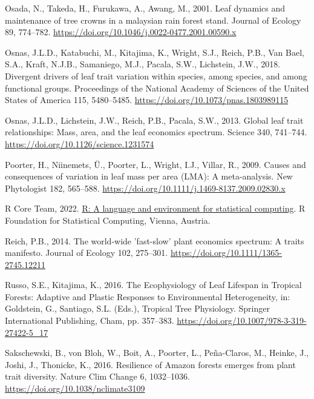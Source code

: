 \documentclass[
  12pt,
  letterpaper,
  DIV=11,
  numbers=noendperiod]{scrartcl}
\newlength{\cslhangindent}
\newenvironment{CSLReferences}[2] %
 {\begin{list}{}{%
  \setlength{\itemindent}{0pt}
  \setlength{\leftmargin}{0pt}
  \setlength{\parsep}{0pt}
  \ifodd #1
   \setlength{\leftmargin}{\cslhangindent}
   \setlength{\itemindent}{-1\cslhangindent}
  \fi
  \setlength{\itemsep}{#2\baselineskip}}}
 {\end{list}}
\begin{document}
\begin{CSLReferences}{1}{0}
Osada, N., Takeda, H., Furukawa, A., Awang, M., 2001. Leaf dynamics and
maintenance of tree crowns in a malaysian rain forest stand. Journal of
Ecology 89, 774--782.
\url{https://doi.org/10.1046/j.0022-0477.2001.00590.x}

Osnas, J.L.D., Katabuchi, M., Kitajima, K., Wright, S.J., Reich, P.B.,
Van Bael, S.A., Kraft, N.J.B., Samaniego, M.J., Pacala, S.W., Lichstein,
J.W., 2018. Divergent drivers of leaf trait variation within species,
among species, and among functional groups. Proceedings of the National
Academy of Sciences of the United States of America 115, 5480--5485.
\url{https://doi.org/10.1073/pnas.1803989115}

Osnas, J.L.D., Lichstein, J.W., Reich, P.B., Pacala, S.W., 2013. Global
leaf trait relationships: {Mass}, area, and the leaf economics spectrum.
Science 340, 741--744. \url{https://doi.org/10.1126/science.1231574}

Poorter, H., Niinemets, Ü., Poorter, L., Wright, I.J., Villar, R., 2009.
Causes and consequences of variation in leaf mass per area ({LMA}): {A}
meta-analysis. New Phytologist 182, 565--588.
\url{https://doi.org/10.1111/j.1469-8137.2009.02830.x}

R Core Team, 2022. \href{https://www.R-project.org/}{R: {A} language and
environment for statistical computing}. R Foundation for Statistical
Computing, Vienna, Austria.

Reich, P.B., 2014. The world-wide 'fast-slow' plant economics spectrum:
{A} traits manifesto. Journal of Ecology 102, 275--301.
\url{https://doi.org/10.1111/1365-2745.12211}

Russo, S.E., Kitajima, K., 2016. The {Ecophysiology} of {Leaf Lifespan}
in {Tropical Forests}: {Adaptive} and {Plastic Responses} to
{Environmental Heterogeneity}, in: Goldstein, G., Santiago, S.L. (Eds.),
Tropical {Tree Physiology}. Springer International Publishing, Cham, pp.
357--383. \url{https://doi.org/10.1007/978-3-319-27422-5_17}

Sakschewski, B., von Bloh, W., Boit, A., Poorter, L., Peña-Claros, M.,
Heinke, J., Joshi, J., Thonicke, K., 2016. Resilience of {Amazon}
forests emerges from plant trait diversity. Nature Clim Change 6,
1032--1036. \url{https://doi.org/10.1038/nclimate3109}


\end{CSLReferences}
\end{document}
